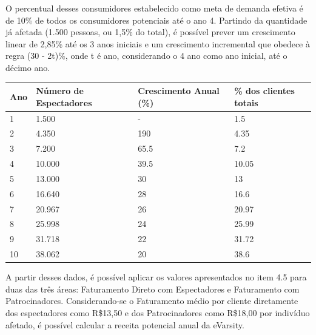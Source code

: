 \documentclass[a4paper, 12pt]{paper}
\begin{document}
O percentual desses consumidores estabelecido como meta de demanda efetiva é de 10\% de todos os consumidores potenciais até o ano 4. Partindo da quantidade já afetada (1.500 pessoas, ou 1,5\% do total), é possível prever um crescimento linear de 2,85\% até os 3 anos iniciais e um crescimento incremental que obedece à regra (30 - 2t)\%, onde t é ano, considerando o 4 ano como ano inicial, até o décimo ano.

\begin{table}[ht]
	\centering
	\begin{tabular}{p{1cm}p{4.5cm}p{4.2cm}p{4cm}}
		\hline
		\cellcolor{gray}Ano&\cellcolor{gray}Número de Espectadores&\cellcolor{gray}Crescimento Anual (\%)&\cellcolor{gray}\% dos clientes totais\\
		\hline
		1&1.500&-&1.5\\
		2&4.350&190&4.35\\
		3&7.200&65.5&7.2\\
		4&10.000&39.5&10.05\\
		5&13.000&30&13\\
		6&16.640&28&16.6\\
		7&20.967&26&20.97\\
		8&25.998&24&25.99\\
		9&31.718&22&31.72\\
		10&38.062&20&38.6\\
		\hline
	\end{tabular}
\end{table}

A partir desses dados, é possível aplicar os valores apresentados no item 4.5 para duas das três áreas: Faturamento Direto com Espectadores e Faturamento com Patrocinadores. Considerando-se o Faturamento médio por cliente diretamente dos espectadores como R\$13,50 e dos Patrocinadores como R\$18,00 por indivíduo afetado, é possível calcular a receita potencial anual da eVarsity.
\end{document}
